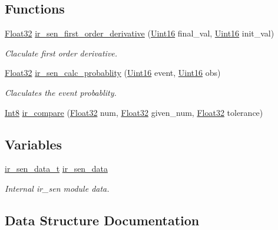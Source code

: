 \subsection*{Functions}
\begin{DoxyCompactItemize}
\item 
\hyperlink{a00072_a87d38f886e617ced2698fc55afa07637}{Float32} \hyperlink{a00023_a1bff969fa2162ccb9701f6e88e8c912e}{ir\+\_\+sen\+\_\+first\+\_\+order\+\_\+derivative} (\hyperlink{a00072_a59a9f6be4562c327cbfb4f7e8e18f08b}{Uint16} final\+\_\+val, \hyperlink{a00072_a59a9f6be4562c327cbfb4f7e8e18f08b}{Uint16} init\+\_\+val)
\begin{DoxyCompactList}\small\item\em Claculate first order derivative. \end{DoxyCompactList}\item 
\hyperlink{a00072_a87d38f886e617ced2698fc55afa07637}{Float32} \hyperlink{a00023_a4a7227cd7b902e9a53daa10ddd05bbbf}{ir\+\_\+sen\+\_\+calc\+\_\+probablity} (\hyperlink{a00072_a59a9f6be4562c327cbfb4f7e8e18f08b}{Uint16} event, \hyperlink{a00072_a59a9f6be4562c327cbfb4f7e8e18f08b}{Uint16} obs)
\begin{DoxyCompactList}\small\item\em Claculates the event probablity. \end{DoxyCompactList}\item 
\hyperlink{a00072_a7e31ca7716b8d85dd473450a5c5e5a97}{Int8} \hyperlink{a00023_a5c2c051f3b2d6fc8651e0e7750e455c2}{ir\+\_\+compare} (\hyperlink{a00072_a87d38f886e617ced2698fc55afa07637}{Float32} num, \hyperlink{a00072_a87d38f886e617ced2698fc55afa07637}{Float32} given\+\_\+num, \hyperlink{a00072_a87d38f886e617ced2698fc55afa07637}{Float32} tolerance)
\end{DoxyCompactItemize}
\subsection*{Variables}
\begin{DoxyCompactItemize}
\item 
\hyperlink{a00023_d6/d21/a00573}{ir\+\_\+sen\+\_\+data\+\_\+t} \hyperlink{a00023_a73dfacb46242746440accc76c7ef710d}{ir\+\_\+sen\+\_\+data}
\begin{DoxyCompactList}\small\item\em Internal ir\+\_\+sen module data. \end{DoxyCompactList}\end{DoxyCompactItemize}


\subsection{Data Structure Documentation}
\label{d6/d21/a00573}
\hypertarget{a00023_d6/d21/a00573}{}
